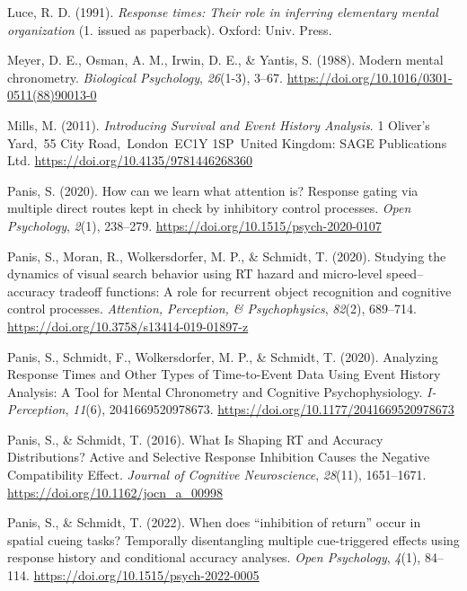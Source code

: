 \documentclass[
  english,
  man,floatsintext]{apa6}
\newlength{\cslhangindent}
\newenvironment{CSLReferences}[2] %
 {\begin{list}{}{%
  \setlength{\itemindent}{0pt}
  \setlength{\leftmargin}{0pt}
  \setlength{\parsep}{0pt}
  \ifodd #1
   \setlength{\leftmargin}{\cslhangindent}
   \setlength{\itemindent}{-1\cslhangindent}
  \fi
  \setlength{\itemsep}{#2\baselineskip}}}
 {\end{list}}
\begin{document}
\begin{CSLReferences}{1}{0}
Luce, R. D. (1991). \emph{Response times: Their role in inferring elementary mental organization} (1. issued as paperback). Oxford: Univ. Press.

Meyer, D. E., Osman, A. M., Irwin, D. E., \& Yantis, S. (1988). Modern mental chronometry. \emph{Biological Psychology}, \emph{26}(1-3), 3--67. \url{https://doi.org/10.1016/0301-0511(88)90013-0}

Mills, M. (2011). \emph{Introducing {Survival} and {Event History Analysis}}. 1 Oliver's Yard,~55 City Road,~London~EC1Y 1SP~United Kingdom: SAGE Publications Ltd. \url{https://doi.org/10.4135/9781446268360}

Panis, S. (2020). How can we learn what attention is? {Response} gating via multiple direct routes kept in check by inhibitory control processes. \emph{Open Psychology}, \emph{2}(1), 238--279. \url{https://doi.org/10.1515/psych-2020-0107}

Panis, S., Moran, R., Wolkersdorfer, M. P., \& Schmidt, T. (2020). Studying the dynamics of visual search behavior using {RT} hazard and micro-level speed--accuracy tradeoff functions: {A} role for recurrent object recognition and cognitive control processes. \emph{Attention, Perception, \& Psychophysics}, \emph{82}(2), 689--714. \url{https://doi.org/10.3758/s13414-019-01897-z}

Panis, S., Schmidt, F., Wolkersdorfer, M. P., \& Schmidt, T. (2020). Analyzing {Response Times} and {Other Types} of {Time-to-Event Data Using Event History Analysis}: {A Tool} for {Mental Chronometry} and {Cognitive Psychophysiology}. \emph{I-Perception}, \emph{11}(6), 2041669520978673. \url{https://doi.org/10.1177/2041669520978673}

Panis, S., \& Schmidt, T. (2016). What {Is Shaping RT} and {Accuracy Distributions}? {Active} and {Selective Response Inhibition Causes} the {Negative Compatibility Effect}. \emph{Journal of Cognitive Neuroscience}, \emph{28}(11), 1651--1671. \url{https://doi.org/10.1162/jocn_a_00998}

Panis, S., \& Schmidt, T. (2022). When does {``inhibition of return''} occur in spatial cueing tasks? {Temporally} disentangling multiple cue-triggered effects using response history and conditional accuracy analyses. \emph{Open Psychology}, \emph{4}(1), 84--114. \url{https://doi.org/10.1515/psych-2022-0005}


\end{CSLReferences}
\end{document}
